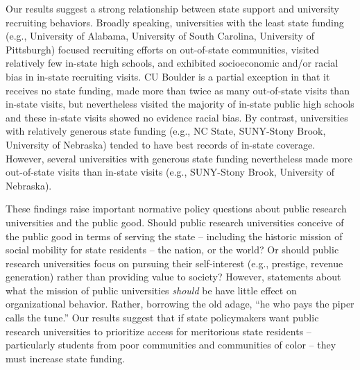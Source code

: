 \documentclass[twoside]{article}
\begin{document}
Our results suggest a strong relationship between state support and university recruiting behaviors.  Broadly speaking, universities with the least state funding (e.g., University of Alabama, University of South Carolina, University of Pittsburgh) focused recruiting efforts on out-of-state communities, visited relatively few in-state high schools, and exhibited socioeconomic and/or racial bias in in-state recruiting visits.  CU Boulder is a partial exception in that it receives no state funding, made more than twice as many out-of-state visits than in-state visits, but nevertheless visited the majority of in-state public high schools and these in-state visits showed no evidence racial bias. By contrast, universities with relatively generous state funding (e.g., NC State, SUNY-Stony Brook, University of Nebraska) tended to have best records of in-state coverage. However, several universities with generous state funding nevertheless made more out-of-state visits than in-state visits (e.g., SUNY-Stony Brook, University of Nebraska).

These findings raise important normative policy questions about public research universities and the public good. Should public research universities conceive of the public good in terms of serving the state -- including the historic mission of social mobility for state residents -- the nation, or the world? Or should public research universities focus on pursuing their self-interest (e.g., prestige, revenue generation) rather than providing value to society? However, statements about what the mission of public universities \textit{should} be have little effect on organizational behavior. Rather, borrowing the old adage,
``he who pays the piper calls the tune.'' Our results suggest that if state policymakers want public research universities to prioritize access for meritorious state residents -- particularly students from poor communities and communities of color -- they must increase state funding.


\end{document}
